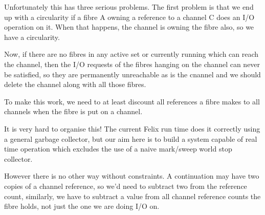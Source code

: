 \documentclass[oneside]{book}
\begin{document}
Unfortunately this has three serious problems. The first problem is that
we end up with a circularity if a fibre A owning a reference to a channel C
does an I/O operation on it. When that happens, the channel is owning
the fibre also, so we have a circularity.

Now, if there are no fibres in any active set or currently running which can
reach the channel, then the I/O requests of the fibres hanging on the channel
can never be satisfied, so they are permanently unreachable as is the cnannel
and we should delete the channel along with all those fibres.

To make this work, we need to at least discount all references a fibre
makes to all channels when the fibre is put on a channel.

It is very hard to organise this! The current Felix run time does it
correctly using a general garbage collector, but our aim here is to build a system
capable of real time operation which excludes the use of a naive mark/sweep
world stop collector.

However there is no other way without constraints. A continuation may have two
copies of a channel reference, so we'd need to subtract two from the reference
count, similarly, we have to subtract a value from all channel reference
counts the fibre holds, not just the one we are doing I/O on.
\end{document}
